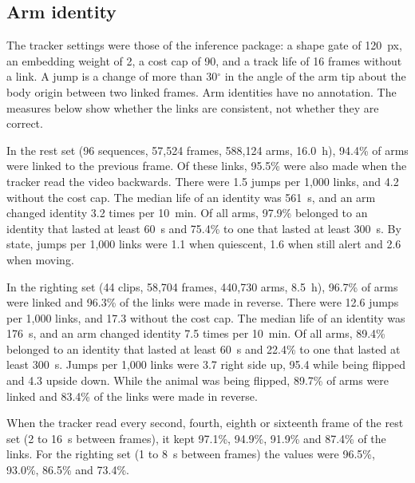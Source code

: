 \subsection*{Arm identity}

The tracker settings were those of the inference package: a shape gate of 120~px, an embedding weight of 2, a cost cap of 90, and a track life of 16 frames without a link.
A jump is a change of more than 30$^{\circ}$ in the angle of the arm tip about the body origin between two linked frames.
Arm identities have no annotation.
The measures below show whether the links are consistent, not whether they are correct.

In the rest set (96 sequences, 57,524 frames, 588,124 arms, 16.0~h), 94.4\% of arms were linked to the previous frame.
Of these links, 95.5\% were also made when the tracker read the video backwards.
There were 1.5 jumps per 1,000 links, and 4.2 without the cost cap.
The median life of an identity was 561~s, and an arm changed identity 3.2 times per 10~min.
Of all arms, 97.9\% belonged to an identity that lasted at least 60~s and 75.4\% to one that lasted at least 300~s.
By state, jumps per 1,000 links were 1.1 when quiescent, 1.6 when still alert and 2.6 when moving.

In the righting set (44 clips, 58,704 frames, 440,730 arms, 8.5~h), 96.7\% of arms were linked and 96.3\% of the links were made in reverse.
There were 12.6 jumps per 1,000 links, and 17.3 without the cost cap.
The median life of an identity was 176~s, and an arm changed identity 7.5 times per 10~min.
Of all arms, 89.4\% belonged to an identity that lasted at least 60~s and 22.4\% to one that lasted at least 300~s.
Jumps per 1,000 links were 3.7 right side up, 95.4 while being flipped and 4.3 upside down.
While the animal was being flipped, 89.7\% of arms were linked and 83.4\% of the links were made in reverse.

When the tracker read every second, fourth, eighth or sixteenth frame of the rest set (2 to 16~s between frames), it kept 97.1\%, 94.9\%, 91.9\% and 87.4\% of the links.
For the righting set (1 to 8~s between frames) the values were 96.5\%, 93.0\%, 86.5\% and 73.4\%.
